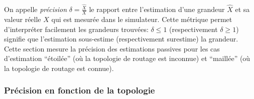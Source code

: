 On appelle \emph{précision} $\delta = \frac{\widehat{X}}{X}$ le rapport entre l'estimation d'une grandeur $\widehat{X}$ et sa valeur réelle $X$ qui est mesurée dans le simulateur.
Cette métrique permet d'interpréter facilement les grandeurs trouvées: $\delta \leq 1$ (respectivement $\delta \geq 1$) signifie que l'estimation sous-estime (respectivement surestime) la grandeur.
Cette section mesure la précision des estimations passives pour les cas d'estimation ``étoilée'' (où la topologie de routage est inconnue) et ``maillée'' (où la topologie de routage est connue).

\subsubsection{Précision en fonction de la topologie}

